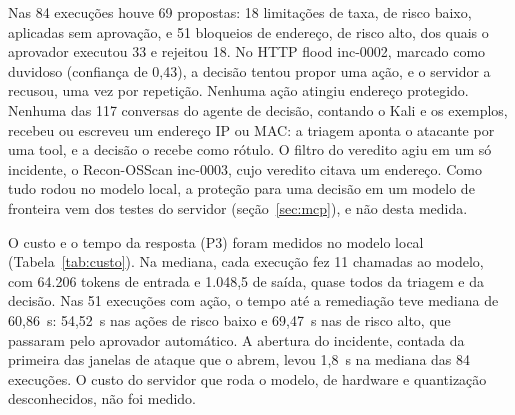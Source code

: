 Nas 84 execuções houve 69 propostas: 18 limitações de taxa, de risco baixo, aplicadas sem aprovação, e 51 bloqueios de endereço, de risco alto, dos quais o aprovador executou 33 e rejeitou 18. No HTTP flood inc-0002, marcado como duvidoso (confiança de 0,43), a decisão tentou propor uma ação, e o servidor a recusou, uma vez por repetição. Nenhuma ação atingiu endereço protegido. Nenhuma das 117 conversas do agente de decisão, contando o Kali e os exemplos, recebeu ou escreveu um endereço IP ou MAC: a triagem aponta o atacante por uma tool, e a decisão o recebe como rótulo. O filtro do veredito agiu em um só incidente, o Recon-OSScan inc-0003, cujo veredito citava um endereço. Como tudo rodou no modelo local, a proteção para uma decisão em um modelo de fronteira vem dos testes do servidor (seção~\ref{sec:mcp}), e não desta medida.

O custo e o tempo da resposta (P3) foram medidos no modelo local (Tabela~\ref{tab:custo}). Na mediana, cada execução fez 11 chamadas ao modelo, com 64.206 tokens de entrada e 1.048,5 de saída, quase todos da triagem e da decisão. Nas 51 execuções com ação, o tempo até a remediação teve mediana de 60,86~s: 54,52~s nas ações de risco baixo e 69,47~s nas de risco alto, que passaram pelo aprovador automático. A abertura do incidente, contada da primeira das janelas de ataque que o abrem, levou 1,8~s na mediana das 84 execuções. O custo do servidor que roda o modelo, de hardware e quantização desconhecidos, não foi medido.

